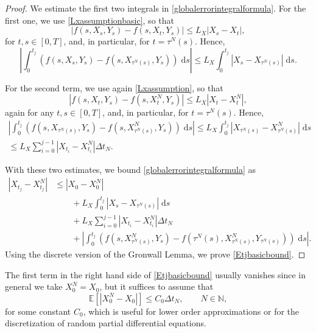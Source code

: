 \documentclass[reqno,12pt]{amsart}
\theoremstyle{plain}%
\theoremstyle{definition}
\begin{document}
\begin{proof}
    We estimate the first two integrals in \eqref{globalerrorintegralformula}. For the first one, we use \eqref{Lxassumptionbasic}, so that
    $$
        |f(s, X_s, Y_s) - f(s, X_t, Y_s)| \leq L_X |X_s - X_t|,
    $$
    for $t, s \in [0, T]$, and, in particular, for $t = \tau^N(s)$. Hence,
    $$
        \left|\int_0^{t_j} \left( f(s, X_s, Y_s) - f(s, X_{\tau^N(s)}, Y_s) \right)\;\mathrm{d}s \right| \leq L_X \int_0^{t_j} |X_s - X_{\tau^N(s)}| \;\mathrm{d}s.
    $$
    
    For the second term, we use again \eqref{Lxassumption}, so that
    $$
        |f(s, X_t, Y_s) - f(s, X_t^N, Y_s)| \leq L_X |X_t - X_t^N|,
    $$
    again for any $t, s \in [0, T]$, and, in particular, for $t = \tau^N(s)$. Hence,
    \begin{multline*}
        \left|\int_0^{t_j} \left( f(s, X_{\tau^N(s)}, Y_s) - f(s, X_{\tau^N(s)}^N, Y_s) \right)\;\mathrm{d}s \right| \leq L_X \int_0^{t_j} |X_{\tau^N(s)} - X_{\tau^N(s)}^N| \;\mathrm{d}s \\
        \leq L_X\sum_{i=0}^{j-1} |X_{t_i} - X_{t_i}^N|\Delta t_N.
    \end{multline*}
    
    With these two estimates, we bound \eqref{globalerrorintegralformula} as
    \begin{align*}
        |X_{t_j} - X_{t_j}^N| & \leq |X_0 - X_0^N| \\
        & \qquad + L_X \int_0^{t_j} |X_s - X_{\tau^N(s)}| \;\mathrm{d}s  \\ 
        & \qquad + L_X\sum_{i=0}^{j-1} |X_{t_i} - X_{t_i}^N|\Delta t_N \\
        & \qquad + \left|\int_0^{t_j} \left( f(s, X_{\tau^N(s)}^N, Y_s) - f(\tau^N(s), X_{\tau^N(s)}^N, Y_{\tau^N(s)}) \right)\;\mathrm{d}s\right|.
    \end{align*}
    Using the discrete version of the Gronwall Lemma, we prove \eqref{Etjbasicbound}.
\end{proof}

The first term in the right hand side of \eqref{Etjbasicbound} usually vanishes since in general we take $X_0^N = X_0$, but it suffices to assume that
\begin{equation}
    \mathbb{E}[|X_0^N - X_0|] \leq C_0 \Delta t_N, \qquad N\in \mathbb{N},
\end{equation}
for some constant $C_0$, which is useful for lower order approximations or for the discretization of random partial differential equations.
\end{document}
